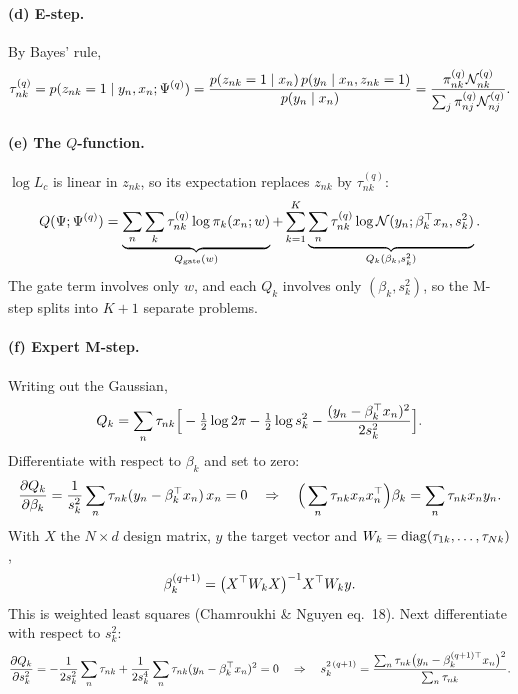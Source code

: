 \paragraph{(d) E-step.} By Bayes' rule,
\begin{equation}
\tau_{nk}^{(q)}=p(z_{nk}=1\mid y_n,x_n;\Psi^{(q)})=\frac{p(z_{nk}=1\mid x_n)\,p(y_n\mid x_n,z_{nk}=1)}{p(y_n\mid x_n)}=\frac{\pi_{nk}^{(q)}\mathcal{N}_{nk}^{(q)}}{\sum_j\pi_{nj}^{(q)}\mathcal{N}_{nj}^{(q)}}.
\end{equation}

\paragraph{(e) The $Q$-function.} $\log L_c$ is linear in $z_{nk}$, so its expectation replaces $z_{nk}$ by $\tau_{nk}^{(q)}$:
\begin{equation}
Q(\Psi;\Psi^{(q)})=\underbrace{\sum_n\sum_k\tau^{(q)}_{nk}\log\pi_k(x_n;w)}_{Q_{\text{gate}}(w)}+\sum_{k=1}^K\underbrace{\sum_n\tau^{(q)}_{nk}\log\mathcal{N}(y_n;\beta_k^{\top} x_n,s_k^2)}_{Q_k(\beta_k,s_k^2)}.
\end{equation}
The gate term involves only $w$, and each $Q_k$ involves only $(\beta_k,s_k^2)$, so the M-step splits into $K+1$ separate problems.

\paragraph{(f) Expert M-step.} Writing out the Gaussian,
\begin{equation}
Q_k=\sum_n\tau_{nk}\Big[-\tfrac12\log2\pi-\tfrac12\log s_k^2-\frac{(y_n-\beta_k^{\top} x_n)^2}{2s_k^2}\Big].
\end{equation}
Differentiate with respect to $\beta_k$ and set to zero:
\begin{equation}
\frac{\partial Q_k}{\partial\beta_k}=\frac1{s_k^2}\sum_n\tau_{nk}(y_n-\beta_k^{\top} x_n)\,x_n=0\quad\Rightarrow\quad\Big(\sum_n\tau_{nk}x_nx_n^{\top}\Big)\beta_k=\sum_n\tau_{nk}x_ny_n.
\end{equation}
With $X$ the $N\times d$ design matrix, $y$ the target vector and $W_k=\operatorname{diag}(\tau_{1k},\dots,\tau_{Nk})$,
\begin{equation}
\beta_k^{(q+1)}=\big(X^{\top} W_kX\big)^{-1}X^{\top} W_ky.
\end{equation}
This is weighted least squares (Chamroukhi \& Nguyen eq.~18). Next differentiate with respect to $s_k^2$:
\begin{equation}
\frac{\partial Q_k}{\partial s_k^2}=-\frac{1}{2s_k^2}\sum_n\tau_{nk}+\frac{1}{2s_k^4}\sum_n\tau_{nk}(y_n-\beta_k^{\top} x_n)^2=0\quad\Rightarrow\quad s_k^{2\,(q+1)}=\frac{\sum_n\tau_{nk}\big(y_n-\beta_k^{(q+1)\top}x_n\big)^2}{\sum_n\tau_{nk}}.
\end{equation}

